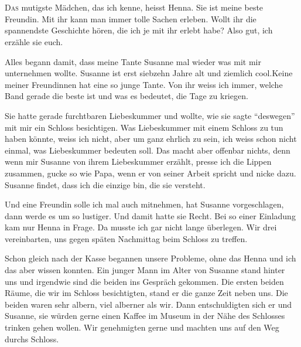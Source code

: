 \chapter*{}
\lettrine[lines=3]{\color{DeepPink}D}{as} mutigste Mädchen, das ich kenne, heisst Henna. Sie ist meine beste Freundin. Mit ihr kann man immer tolle Sachen erleben. Wollt ihr die spannendste Geschichte hören, die ich je mit ihr erlebt habe? Also gut, ich erzähle sie euch.

Alles begann damit, dass meine Tante Susanne mal wieder was mit mir unternehmen wollte. Susanne ist erst siebzehn Jahre alt und ziemlich cool.Keine meiner Freundinnen hat eine so junge Tante. Von ihr weiss ich immer, welche Band gerade die beste ist und was es bedeutet, die Tage zu kriegen.

Sie hatte gerade furchtbaren Liebeskummer und wollte, wie sie sagte \enquote{deswegen} mit mir ein Schloss besichtigen. Was Liebeskummer mit einem Schloss zu tun haben könnte, weiss ich nicht, aber um ganz ehrlich zu sein, ich weiss schon nicht einmal, was Liebeskummer bedeuten soll. Das macht aber offenbar nichts, denn wenn mir Susanne von ihrem Liebeskummer erzählt, presse ich die Lippen zusammen, gucke so wie Papa, wenn er von seiner Arbeit spricht und nicke dazu. Susanne findet, dass ich die einzige bin, die sie versteht.

Und eine Freundin solle ich mal auch mitnehmen, hat Susanne vorgeschlagen, dann werde es um so lustiger. Und damit hatte sie Recht. Bei so einer Einladung kam nur Henna in Frage. Da musste ich gar nicht lange überlegen. Wir drei vereinbarten, uns gegen späten Nachmittag beim Schloss zu treffen.

Schon gleich nach der Kasse begannen unsere Probleme, ohne das Henna und ich das aber wissen konnten. Ein junger Mann im Alter von Susanne stand hinter uns und irgendwie sind die beiden ins Gespräch gekommen. Die ersten beiden Räume, die wir im Schloss besichtigten, stand er die ganze Zeit neben uns. Die beiden waren sehr albern, viel alberner als wir. Dann entschuldigten sich er und Susanne, sie würden gerne einen Kaffee im Museum in der Nähe des Schlosses trinken gehen wollen. Wir genehmigten gerne und machten uns auf den Weg durchs Schloss.


